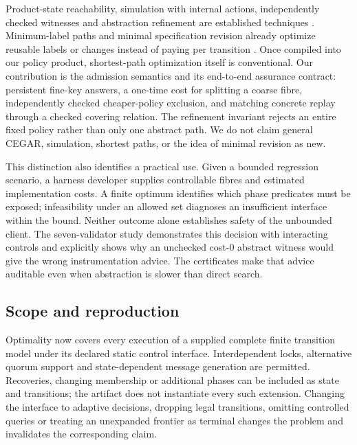 Product-state reachability, simulation with internal actions,
independently checked witnesses and abstraction refinement are
established techniques
\cite{lynch1995simulations,mcconnell2011certifying,clarke2003cegar}.
Minimum-label paths and minimal specification revision already optimize
reusable labels or changes instead of paying per transition
\cite{kumar2021color,kim2015revision}. Once compiled into our policy
product, shortest-path optimization itself is conventional. Our
contribution is the admission semantics and its end-to-end assurance
contract: persistent fine-key answers, a one-time cost for splitting a
coarse fibre, independently checked cheaper-policy exclusion, and
matching concrete replay through a checked covering relation. The
refinement invariant rejects an entire fixed policy rather than only one
abstract path. We do not claim general CEGAR, simulation, shortest
paths, or the idea of minimal revision as new.

This distinction also identifies a practical use. Given a bounded
regression scenario, a harness developer supplies controllable fibres
and estimated implementation costs. A finite optimum identifies which
phase predicates must be exposed; infeasibility under an allowed set
diagnoses an insufficient interface within the bound. Neither outcome
alone establishes safety of the unbounded client. The seven-validator
study demonstrates this decision with interacting controls and
explicitly shows why an unchecked cost-0 abstract witness would give the
wrong instrumentation advice. The certificates make that advice
auditable even when abstraction is slower than direct search.

\subsection{Scope and reproduction}\label{scope-and-reproduction}

Optimality now covers every execution of a supplied complete finite
transition model under its declared static control interface.
Interdependent locks, alternative quorum support and state-dependent
message generation are permitted. Recoveries, changing membership or
additional phases can be included as state and transitions; the artifact
does not instantiate every such extension. Changing the interface to
adaptive decisions, dropping legal transitions, omitting controlled
queries or treating an unexpanded frontier as terminal changes the
problem and invalidates the corresponding claim.

